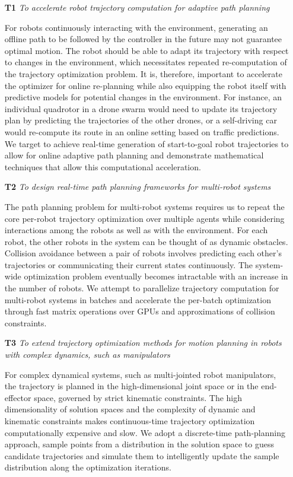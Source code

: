 \begin{enumerate}\label{enum:problems-addressed-by-thesis}
    \item[\textbf{T1}] \textit{To accelerate robot trajectory computation for adaptive path planning}

    For robots continuously interacting with the environment, generating an offline path to be followed by the controller in the future may not guarantee optimal motion. The robot should be able to adapt its trajectory with respect to changes in the environment, which necessitates repeated re-computation of the trajectory optimization problem. It is, therefore, important to accelerate the optimizer for online re-planning while also equipping the robot itself with predictive models for potential changes in the environment. For instance, an individual quadrotor in a drone swarm would need to update its trajectory plan by predicting the trajectories of the other drones, or a self-driving car would re-compute its route in an online setting based on traffic predictions. We target to achieve real-time generation of start-to-goal robot trajectories to allow for online adaptive path planning and demonstrate mathematical techniques that allow this computational acceleration.
    

    \item[\textbf{T2}] \textit{To design real-time path planning frameworks for multi-robot systems}\label{intro:multi-robot_aim}

    The path planning problem for multi-robot systems requires us to repeat the core per-robot trajectory optimization over multiple agents while considering interactions among the robots as well as with the environment. For each robot, the other robots in the system can be thought of as dynamic obstacles. Collision avoidance between a pair of robots involves predicting each other's trajectories or communicating their current states continuously. The system-wide optimization problem eventually becomes intractable with an increase in the number of robots. We attempt to parallelize trajectory computation for multi-robot systems in batches and accelerate the per-batch optimization through fast matrix operations over GPUs and approximations of collision constraints.

    \item[\textbf{T3}] \textit{To extend trajectory optimization methods for motion planning in robots with complex dynamics, such as manipulators}

    For complex dynamical systems, such as multi-jointed robot manipulators, the trajectory is planned in the high-dimensional joint space or in the end-effector space, governed by strict kinematic constraints. The high dimensionality of solution spaces and the complexity of dynamic and kinematic constraints makes continuous-time trajectory optimization computationally expensive and slow. We adopt a discrete-time path-planning approach, sample points from a distribution in the solution space to guess candidate trajectories and simulate them to intelligently update the sample distribution along the optimization iterations. 
    
\end{enumerate}

